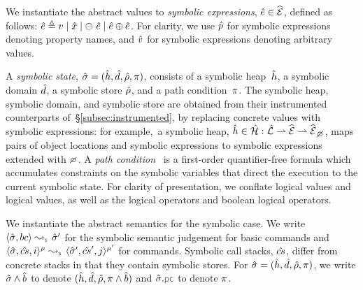 We instantiate the abstract values to \emph{symbolic expressions}, $\hat{e} \in \widehat{\text{$\mathcal{E}$}}$, defined as follows: 
$\hat{e} \triangleq v \mid \hat{x} \mid \ominus\ \hat{e} \mid \hat{e} \oplus \hat{e}$. 
For clarity, we use $\hat{p}$ for symbolic expressions denoting property names, and $\hat{v}$ for symbolic
expressions denoting arbitrary values. 


A \emph{symbolic state}, $\hat{\sigma} = (\hat{h}, \hat{d}, \hat\rho, \pi)$, consists of a 
symbolic heap~$\hat{h}$, a symbolic domain $\hat{d}$, a symbolic store $\hat\rho$, and a path condition~$\pi$. 
The symbolic heap, symbolic domain, and symbolic store are obtained from their instrumented 
counterparts of~\S\ref{subsec:instrumented}, by replacing concrete values with symbolic expressions: for example,~a symbolic heap, $\sheap \in \sheaps : \slocs \partialmap \sexprs \partialmap \setext{\sexprs}{\none}$,
 maps pairs of object locations and symbolic expressions to symbolic expressions
extended with $\none$. 
A \emph{path condition}~\cite{symb:exec:survey} is a first-order quantifier-free formula which
 accumulates constraints on the symbolic variables that direct 
the execution to the current symbolic state.
For clarity of presentation, we conflate \jsil logical values and logical values, as well as the \jsil logical operators and boolean logical operators.

We instantiate the abstract semantics for the symbolic case.  
We write $\absbsemrule{\sstate, \bcmd}{\sstate'}{\symbolic}$ for the symbolic semantic 
judgement for basic commands and $\abssemrule{\sstate, \scs, i}{\sstate', \scs', j}{\mode}{\mode'}{\symbolic}$ 
for commands. Symbolic call stacks, $\hat{cs}$, differ from concrete stacks in that they contain symbolic stores.
For $\hat{\sigma} = (\hat{h}, \hat{d}, \hat\rho, \pi)$, we write $\hat{\sigma} \wedge \hat{b}$ to denote $(\hat{h}, \hat{d}, \hat\rho, \pi \wedge \hat{b})$ and $\sstate.\pcsel\!$ to denote $\pi$.

